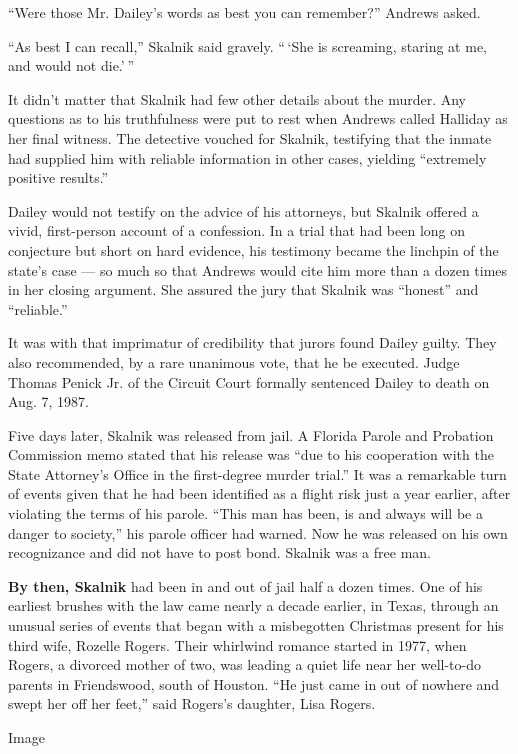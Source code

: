 ``Were those Mr. Dailey's words as best you can remember?'' Andrews
asked.

``As best I can recall,'' Skalnik said gravely. `` `She is screaming,
staring at me, and would not die.' ''

It didn't matter that Skalnik had few other details about the murder.
Any questions as to his truthfulness were put to rest when Andrews
called Halliday as her final witness. The detective vouched for Skalnik,
testifying that the inmate had supplied him with reliable information in
other cases, yielding ``extremely positive results.''

Dailey would not testify on the advice of his attorneys, but Skalnik
offered a vivid, first-person account of a confession. In a trial that
had been long on conjecture but short on hard evidence, his testimony
became the linchpin of the state's case --- so much so that Andrews
would cite him more than a dozen times in her closing argument. She
assured the jury that Skalnik was ``honest'' and ``reliable.''

It was with that imprimatur of credibility that jurors found Dailey
guilty. They also recommended, by a rare unanimous vote, that he be
executed. Judge Thomas Penick Jr. of the Circuit Court formally
sentenced Dailey to death on Aug. 7, 1987.

Five days later, Skalnik was released from jail. A Florida Parole and
Probation Commission memo stated that his release was ``due to his
cooperation with the State Attorney's Office in the first-degree murder
trial.'' It was a remarkable turn of events given that he had been
identified as a flight risk just a year earlier, after violating the
terms of his parole. ``This man has been, is and always will be a danger
to society,'' his parole officer had warned. Now he was released on his
own recognizance and did not have to post bond. Skalnik was a free man.

\textbf{By then, Skalnik} had been in and out of jail half a dozen
times. One of his earliest brushes with the law came nearly a decade
earlier, in Texas, through an unusual series of events that began with a
misbegotten Christmas present for his third wife, Rozelle Rogers. Their
whirlwind romance started in 1977, when Rogers, a divorced mother of
two, was leading a quiet life near her well-to-do parents in
Friendswood, south of Houston. ``He just came in out of nowhere and
swept her off her feet,'' said Rogers's daughter, Lisa Rogers.

Image

